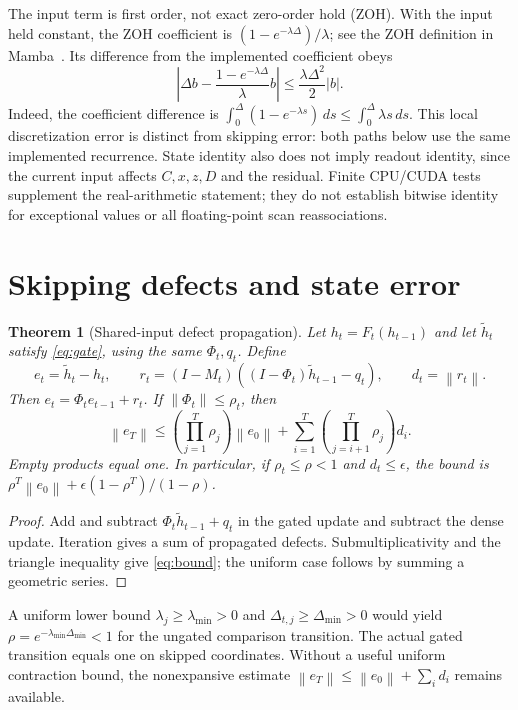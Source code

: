 \documentclass[11pt]{article}
\newtheorem{theorem}[proposition]{Theorem}
\newcommand{\norm}[1]{\left\lVert#1\right\rVert}
\begin{document}
The input term is first order, not exact zero-order hold (ZOH). With the input
held constant, the ZOH coefficient is $(1-e^{-\lambda\Delta})/\lambda$;
see the ZOH definition in Mamba~\cite{gu2024}. Its difference from the
implemented coefficient obeys
\begin{equation}\label{eq:zoh}
 \left|\Delta b-\frac{1-e^{-\lambda\Delta}}{\lambda}b\right|
 \le \frac{\lambda\Delta^2}{2}|b|.
\end{equation}
Indeed, the coefficient difference is
$\int_0^\Delta(1-e^{-\lambda s})\,ds\le\int_0^\Delta\lambda s\,ds$.
This local discretization error is distinct from skipping error: both paths
below use the same implemented recurrence. State identity also does not imply
readout identity, since the current input affects $C,x,z,D$ and the residual.
Finite CPU/CUDA tests supplement the real-arithmetic statement; they do not
establish bitwise identity for exceptional values or all floating-point scan
reassociations.

\section{Skipping defects and state error}
\begin{theorem}[Shared-input defect propagation]\label{thm:defect}
Let $h_t=F_t(h_{t-1})$ and let $\widetilde h_t$ satisfy
\eqref{eq:gate}, using the same $\Phi_t,q_t$. Define
\begin{equation}
 e_t=\widetilde h_t-h_t,\qquad
 r_t=(I-M_t)((I-\Phi_t)\widetilde h_{t-1}-q_t),\qquad d_t=\norm{r_t}.
\end{equation}
Then $e_t=\Phi_t e_{t-1}+r_t$. If $\norm{\Phi_t}\le\rho_t$, then
\begin{equation}\label{eq:bound}
 \norm{e_T}\le\left(\prod_{j=1}^T\rho_j\right)\norm{e_0}
 +\sum_{i=1}^T\left(\prod_{j=i+1}^T\rho_j\right)d_i.
\end{equation}
Empty products equal one. In particular, if $\rho_t\le\rho<1$ and
$d_t\le\epsilon$, the bound is
$\rho^T\norm{e_0}+\epsilon(1-\rho^T)/(1-\rho)$.
\end{theorem}
\begin{proof}
Add and subtract $\Phi_t\widetilde h_{t-1}+q_t$ in the gated update and
subtract the dense update. Iteration gives a sum of propagated defects.
Submultiplicativity and the triangle inequality give \eqref{eq:bound};
the uniform case follows by summing a geometric series.
\end{proof}

A uniform lower bound $\lambda_j\ge\lambda_{\min}>0$ and
$\Delta_{t,j}\ge\Delta_{\min}>0$ would yield
$\rho=e^{-\lambda_{\min}\Delta_{\min}}<1$ for the ungated comparison
transition. The actual gated transition equals one on skipped coordinates.
Without a useful uniform contraction bound, the nonexpansive estimate
$\norm{e_T}\le\norm{e_0}+\sum_i d_i$ remains available.
\end{document}
